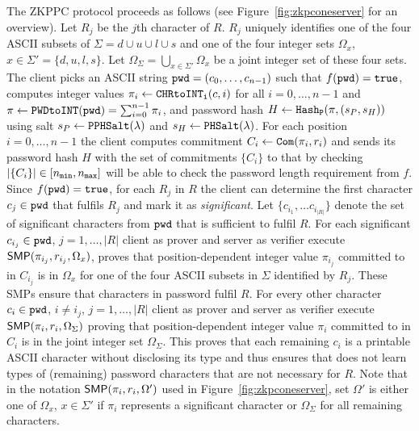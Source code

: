 The \ac{ZKPPC} protocol proceeds as follows (see Figure~\ref{fig:zkpconeserver} for an overview). 
Let $R_j$ be the $j$th character of $R$. 
$R_j$ uniquely identifies one of the four \ac{ASCII} subsets of $\Sigma = d \cup u \cup l \cup s$ and one of the four integer sets $\Omega_x$, $x\in\Sigma'=\{d, u, l, s\}$. 
Let $\Omega_\Sigma=\bigcup_{x\in\Sigma'}\Omega_x$ be a joint integer set of these four sets. 
The client picks an \ac{ASCII} string $\mathtt{pwd}=(c_0,\ldots,c_{n-1})$ such that $f(\mathtt{pwd})=\mathtt{true}$, computes integer values $\pi_i\gets\texttt{CHRtoINT}_\texttt{i}(c, i)$ for all $i= 0,\ldots, n-1$ and $\pi \gets \texttt{PWDtoINT}(\mathtt{pwd}) = \sum_{i=0}^{n-1}\pi_i$, and password hash $H\gets \mathtt{Hash_P}(\pi, (s_P, s_H))$ using salt $s_P\gets\mathtt{PPHSalt}(\lambda)$ and $s_H\gets\mathtt{PHSalt}(\lambda)$. 
For each position $i=0,\ldots,n-1$ the client computes commitment $C_i \gets \mathtt{Com}(\pi_i, r_i)$ and sends its password hash $H$ with the set of commitments $\{C_i\}$ to \Server that by checking $|\{C_i\}|\in[{n_\mathtt{min}},{n_\mathtt{max}}]$ will be able to check the password length requirement from $f$. 
Since $f(\mathtt{pwd})=\mathtt{true}$, for each $R_j$ in $R$ the client can determine the first character $c_j\in\mathtt{pwd}$ that fulfils $R_j$ and mark it as \emph{significant}. 
Let $\{c_{i_1},\ldots c_{i_{|R|}}\}$ denote the set of significant characters from $\mathtt{pwd}$ that is sufficient to fulfil $R$. 
For each significant $c_{i_j}\in\mathtt{pwd}$, $j=1,\ldots, |R|$ client \Client as prover and server \Server as verifier execute $\mathsf{SMP}(\pi_{i_j},r_{i_j},\Omega_x)$, \ie \Client proves that position-dependent integer value $\pi_{i_j}$ committed to in $C_{i_j}$ is in $\Omega_x$ for one of the four \ac{ASCII} subsets in $\Sigma$ identified by $R_j$. 
These \acp{SMP} ensure that characters in password \pwd fulfil $R$. 
For every other character $c_i\in\mathtt{pwd}$, $i\neq i_j$, $j=1,\ldots, |R|$ client \Client as prover and server \Server as verifier execute $\mathsf{SMP}(\pi_{i},r_{i},\Omega_\Sigma)$ proving that position-dependent integer value $\pi_{i}$ committed to in $C_{i}$ is in the joint integer set $\Omega_{\Sigma}$. 
This proves that each remaining $c_i$ is a printable \ac{ASCII} character without disclosing its type and thus ensures that \Server does not learn types of (remaining) password characters that are not necessary for $R$. 
Note that in the notation $\mathsf{SMP}(\pi_i,r_i,\Omega')$ used in Figure~\ref{fig:zkpconeserver}, set $\Omega'$ is either one of $\Omega_x$, $x\in\Sigma'$ if $\pi_i$ represents a significant character or $\Omega_\Sigma$ for all remaining characters.

